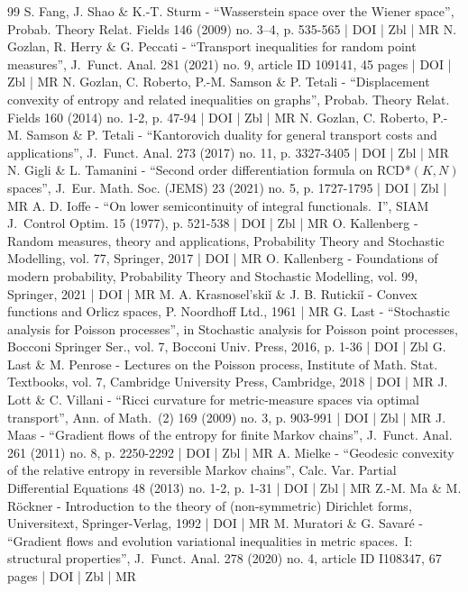 \documentclass[10pt]{amsart}
\theoremstyle{definition}
\theoremstyle{remark}
\begin{document}
\begin{thebibliography}{99}
S. Fang, J. Shao \& K.-T. Sturm - “Wasserstein space over the Wiener space”, Probab. Theory Relat. Fields 146 (2009) no. 3–4, p. 535-565 | DOI | Zbl | MR
N. Gozlan, R. Herry \& G. Peccati - “Transport inequalities for random point measures”, J. Funct. Anal. 281 (2021) no. 9, article ID 109141, 45 pages | DOI | Zbl | MR
N. Gozlan, C. Roberto, P.-M. Samson \& P. Tetali - “Displacement convexity of entropy and related inequalities on graphs”, Probab. Theory Relat. Fields 160 (2014) no. 1-2, p. 47-94 | DOI | Zbl | MR
N. Gozlan, C. Roberto, P.-M. Samson \& P. Tetali - “Kantorovich duality for general transport costs and applications”, J. Funct. Anal. 273 (2017) no. 11, p. 3327-3405 | DOI | Zbl | MR
N. Gigli \& L. Tamanini - “Second order differentiation formula on RCD*$(K,N)$ spaces”, J. Eur. Math. Soc. (JEMS) 23 (2021) no. 5, p. 1727-1795 | DOI | Zbl | MR
A. D. Ioffe - “On lower semicontinuity of integral functionals. I”, SIAM J. Control Optim. 15 (1977), p. 521-538 | DOI | Zbl | MR
O. Kallenberg - Random measures, theory and applications, Probability Theory and Stochastic Modelling, vol. 77, Springer, 2017 | DOI | MR
O. Kallenberg - Foundations of modern probability, Probability Theory and Stochastic Modelling, vol. 99, Springer, 2021 | DOI | MR
M. A. Krasnosel’skiǐ \& J. B. Rutickiǐ - Convex functions and Orlicz spaces, P. Noordhoff Ltd., 1961 | MR
G. Last - “Stochastic analysis for Poisson processes”, in Stochastic analysis for Poisson point processes, Bocconi Springer Ser., vol. 7, Bocconi Univ. Press, 2016, p. 1-36 | DOI | Zbl
G. Last \& M. Penrose - Lectures on the Poisson process, Institute of Math. Stat. Textbooks, vol. 7, Cambridge University Press, Cambridge, 2018 | DOI | MR
J. Lott \& C. Villani - “Ricci curvature for metric-measure spaces via optimal transport”, Ann. of Math. (2) 169 (2009) no. 3, p. 903-991 | DOI | Zbl | MR
J. Maas - “Gradient flows of the entropy for finite Markov chains”, J. Funct. Anal. 261 (2011) no. 8, p. 2250-2292 | DOI | Zbl | MR
A. Mielke - “Geodesic convexity of the relative entropy in reversible Markov chains”, Calc. Var. Partial Differential Equations 48 (2013) no. 1-2, p. 1-31 | DOI | Zbl | MR
Z.-M. Ma \& M. Röckner - Introduction to the theory of (non-symmetric) Dirichlet forms, Universitext, Springer-Verlag, 1992 | DOI | MR
M. Muratori \& G. Savaré - “Gradient flows and evolution variational inequalities in metric spaces. I: structural properties”, J. Funct. Anal. 278 (2020) no. 4, article ID I108347, 67 pages | DOI | Zbl | MR

\end{thebibliography}
\end{document}
